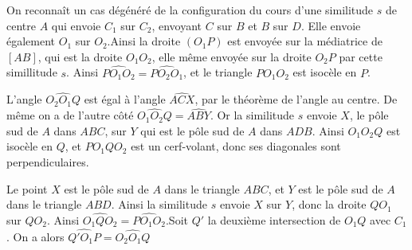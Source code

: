 \begin{sol}
On reconnaît un cas dégénéré de la configuration du cours d'une similitude $s$ de centre $A$ qui envoie $C_1$ sur $C_2$, envoyant $C$ sur $B$ et $B$ sur $D$. Elle envoie également $O_1$ sur $O_2$.Ainsi la droite $(O_1P)$ est envoyée sur la médiatrice de $[AB]$, qui est la droite $O_1O_2$, elle même envoyée sur la droite $O_2P$ par cette simillitude $s$. Ainsi $\widehat{PO_1O_2} = \widehat{PO_2O_1}$, et le triangle $PO_1O_2$ est isocèle en $P$.

\medskip

L'angle $\widehat{O_2O_1Q}$ est égal à l'angle $\widehat{ACX}$, par le théorème de l'angle au centre. De même on a de l'autre côté $\widehat{O_1O_2Q} = \widehat{ABY}$. Or la similitude $s$ envoie $X$, le pôle sud de $A$ dans $ABC$, sur $Y$ qui est le pôle sud de $A$ dans $ADB$. Ainsi $O_1O_2Q$ est isocèle en $Q$, et $PO_1QO_2$ est un cerf-volant, donc ses diagonales sont perpendiculaires.

\medskip

Le point $X$ est le pôle sud de $A$ dans le triangle $ABC$, et $Y$ est le pôle sud de $A$ dans le triangle $ABD$. Ainsi la similitude $s$ envoie $X$ sur $Y$, donc la droite $QO_1$ sur $QO_2$. Ainsi $\widehat{O_1QO_2} = \widehat{PO_1O_2}$.Soit $Q'$ la deuxième intersection de $O_1Q$ avec $C_1$. On a alors $\widehat{Q'O_1P} = \widehat{O_2O_1Q}$
\end{sol}


